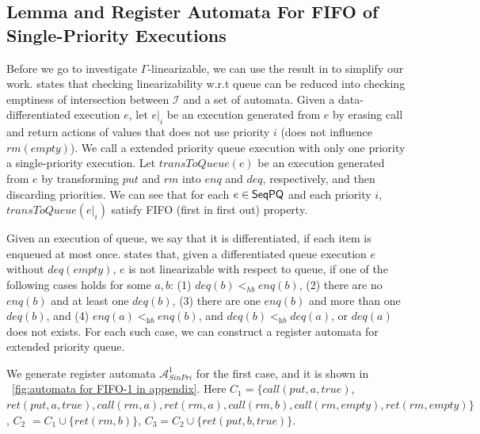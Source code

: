 \subsection{Lemma and Register Automata For FIFO of Single-Priority Executions}
\label{sec:appendix lemma and register automata for FIFO of single-priority executions}

Before we go to investigate $\Gamma$-linearizable, we can use the result in \cite{DBLP:conf/icalp/BouajjaniEEH15} to simplify our work. \cite{DBLP:conf/icalp/BouajjaniEEH15} states that checking linearizability w.r.t queue can be reduced into checking emptiness of intersection between $\mathcal{I}$ and a set of automata. Given a data-differentiated execution $e$, let $e \vert_{i}$ be an execution generated from $e$ by erasing call and return actions of values that does not use priority $i$ (does not influence $\textit{rm}(\textit{empty})$). We call a extended priority queue execution with only one priority a single-priority execution. Let $\textit{transToQueue}(e)$ be an execution generated from $e$ by transforming $\textit{put}$ and $\textit{rm}$ into $\textit{enq}$ and $\textit{deq}$, respectively, and then discarding priorities. We can see that for each $e \in \mathsf{SeqPQ}$ and each priority $i$, $\textit{transToQueue}(e \vert_{i})$ satisfy FIFO (first in first out) property.

Given an execution of queue, we say that it is differentiated, if each item is enqueued at most once. \cite{DBLP:conf/icalp/BouajjaniEEH15} states that, given a differentiated queue execution $e$ without $\textit{deq}(\textit{empty})$, $e$ is not linearizable with respect to queue, if one of the following cases holds for some $a,b$: (1) $\textit{deq}(b) <_{hb} \textit{enq}(b)$, (2) there are no $\textit{enq}(b)$ and at least one $\textit{deq}(b)$, (3) there are one $\textit{enq}(b)$ and more than one $\textit{deq}(b)$, and (4) $\textit{enq}(a) <_{\textit{hb}} \textit{enq}(b)$, and $\textit{deq}(b) <_{\textit{hb}} \textit{deq}(a)$, or $\textit{deq}(a)$ does not exists. For each such case, we can construct a register automata for extended priority queue.

We generate register automata $\mathcal{A}_{\textit{SinPri}}^1$ for the first case, and it is shown in \figurename~\ref{fig:automata for FIFO-1 in appendix}. Here $C_1 = \{ \textit{call}(\textit{put},a,\textit{true})$, $\textit{ret}(\textit{put},a,\textit{true}), \textit{call}(\textit{rm},a),\textit{ret}(\textit{rm},a),\textit{call}(\textit{rm},b),\textit{call}(\textit{rm},\textit{empty}),\textit{ret}(\textit{rm},\textit{empty}) \}$, $C_2$ $= C_1 \cup \{ \textit{ret}(\textit{rm},b) \}$, $C_3 = C_2 \cup \{ \textit{ret}(\textit{put},b,\textit{true}) \}$.


